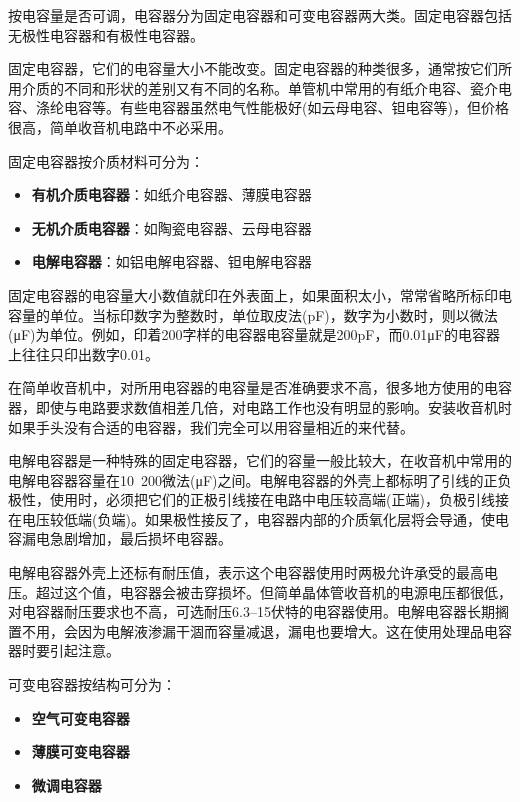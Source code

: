 \documentclass[12pt,UTF8]{ctexbook}
\begin{document}
按电容量是否可调，电容器分为固定电容器和可变电容器两大类。固定电容器包括无极性电容器和有极性电容器。

固定电容器，它们的电容量大小不能改变。固定电容器的种类很多，通常按它们所用介质的不同和形状的差别又有不同的名称。单管机中常用的有纸介电容、瓷介电容、涤纶电容等。有些电容器虽然电气性能极好(如云母电容、钽电容等)，但价格很高，简单收音机电路中不必采用。

固定电容器按介质材料可分为：

\begin{itemize}[leftmargin=2cm]
	\item \textbf{有机介质电容器}：如纸介电容器、薄膜电容器
	\item \textbf{无机介质电容器}：如陶瓷电容器、云母电容器
	\item \textbf{电解电容器}：如铝电解电容器、钽电解电容器
\end{itemize}

固定电容器的电容量大小数值就印在外表面上，如果面积太小，常常省略所标印电容量的单位。当标印数字为整数时，单位取皮法(pF)，数字为小数时，则以微法(μF)为单位。例如，印着200字样的电容器电容量就是200pF，而0.01μF的电容器上往往只印出数字0.01。

在简单收音机中，对所用电容器的电容量是否准确要求不高，很多地方使用的电容器，即使与电路要求数值相差几倍，对电路工作也没有明显的影响。安装收音机时如果手头没有合适的电容器，我们完全可以用容量相近的来代替。

电解电容器是一种特殊的固定电容器，它们的容量一般比较大，在收音机中常用的电解电容器容量在10~200微法(μF)之间。电解电容器的外壳上都标明了引线的正负极性，使用时，必须把它们的正极引线接在电路中电压较高端(正端)，负极引线接在电压较低端(负端)。如果极性接反了，电容器内部的介质氧化层将会导通，使电容漏电急剧增加，最后损坏电容器。

电解电容器外壳上还标有耐压值，表示这个电容器使用时两极允许承受的最高电压。超过这个值，电容器会被击穿损坏。但简单晶体管收音机的电源电压都很低，对电容器耐压要求也不高，可选耐压6.3--15伏特的电容器使用。电解电容器长期搁置不用，会因为电解液渗漏干涸而容量减退，漏电也要增大。这在使用处理品电容器时要引起注意。

可变电容器按结构可分为：

\begin{itemize}[leftmargin=2cm]
	\item \textbf{空气可变电容器}
	\item \textbf{薄膜可变电容器}
	\item \textbf{微调电容器}
\end{itemize}
\end{document}

